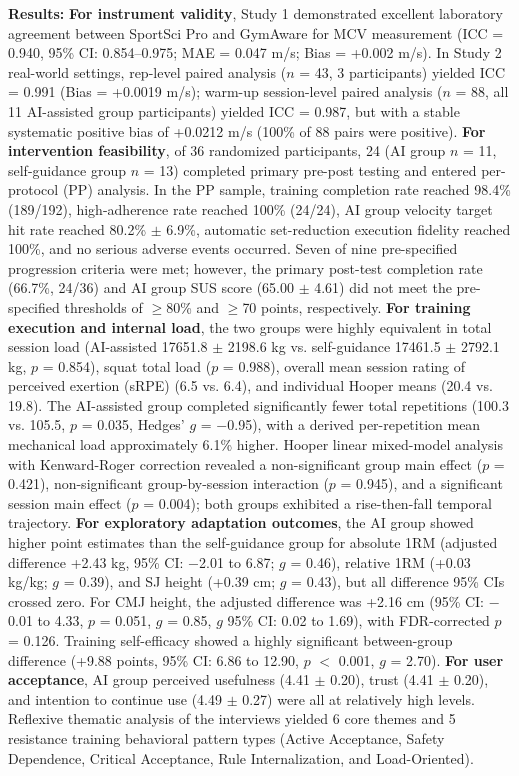 \textbf{Results:} \textbf{For instrument validity}, Study 1 demonstrated excellent laboratory agreement between SportSci Pro and GymAware for MCV measurement (ICC = 0.940, 95\% CI: 0.854--0.975; MAE = 0.047 m/s; Bias = +0.002 m/s). In Study 2 real-world settings, rep-level paired analysis ($n$ = 43, 3 participants) yielded ICC = 0.991 (Bias = +0.0019 m/s); warm-up session-level paired analysis ($n$ = 88, all 11 AI-assisted group participants) yielded ICC = 0.987, but with a stable systematic positive bias of +0.0212 m/s (100\% of 88 pairs were positive). \textbf{For intervention feasibility}, of 36 randomized participants, 24 (AI group $n$ = 11, self-guidance group $n$ = 13) completed primary pre-post testing and entered per-protocol (PP) analysis. In the PP sample, training completion rate reached 98.4\% (189/192), high-adherence rate reached 100\% (24/24), AI group velocity target hit rate reached 80.2\% $\pm$ 6.9\%, automatic set-reduction execution fidelity reached 100\%, and no serious adverse events occurred. Seven of nine pre-specified progression criteria were met; however, the primary post-test completion rate (66.7\%, 24/36) and AI group SUS score (65.00 $\pm$ 4.61) did not meet the pre-specified thresholds of $\geq$80\% and $\geq$70 points, respectively. \textbf{For training execution and internal load}, the two groups were highly equivalent in total session load (AI-assisted 17651.8 $\pm$ 2198.6 kg vs. self-guidance 17461.5 $\pm$ 2792.1 kg, $p$ = 0.854), squat total load ($p$ = 0.988), overall mean session rating of perceived exertion (sRPE) (6.5 vs. 6.4), and individual Hooper means (20.4 vs. 19.8). The AI-assisted group completed significantly fewer total repetitions (100.3 vs. 105.5, $p$ = 0.035, Hedges' $g$ = $-$0.95), with a derived per-repetition mean mechanical load approximately 6.1\% higher. Hooper linear mixed-model analysis with Kenward-Roger correction revealed a non-significant group main effect ($p$ = 0.421), non-significant group-by-session interaction ($p$ = 0.945), and a significant session main effect ($p$ = 0.004); both groups exhibited a rise-then-fall temporal trajectory. \textbf{For exploratory adaptation outcomes}, the AI group showed higher point estimates than the self-guidance group for absolute 1RM (adjusted difference +2.43 kg, 95\% CI: $-$2.01 to 6.87; $g$ = 0.46), relative 1RM (+0.03 kg/kg; $g$ = 0.39), and SJ height (+0.39 cm; $g$ = 0.43), but all difference 95\% CIs crossed zero. For CMJ height, the adjusted difference was +2.16 cm (95\% CI: $-$0.01 to 4.33, $p$ = 0.051, $g$ = 0.85, $g$ 95\% CI: 0.02 to 1.69), with FDR-corrected $p$ = 0.126. Training self-efficacy showed a highly significant between-group difference (+9.88 points, 95\% CI: 6.86 to 12.90, $p$ $<$ 0.001, $g$ = 2.70). \textbf{For user acceptance}, AI group perceived usefulness (4.41 $\pm$ 0.20), trust (4.41 $\pm$ 0.20), and intention to continue use (4.49 $\pm$ 0.27) were all at relatively high levels. Reflexive thematic analysis of the interviews yielded 6 core themes and 5 resistance training behavioral pattern types (Active Acceptance, Safety Dependence, Critical Acceptance, Rule Internalization, and Load-Oriented).

